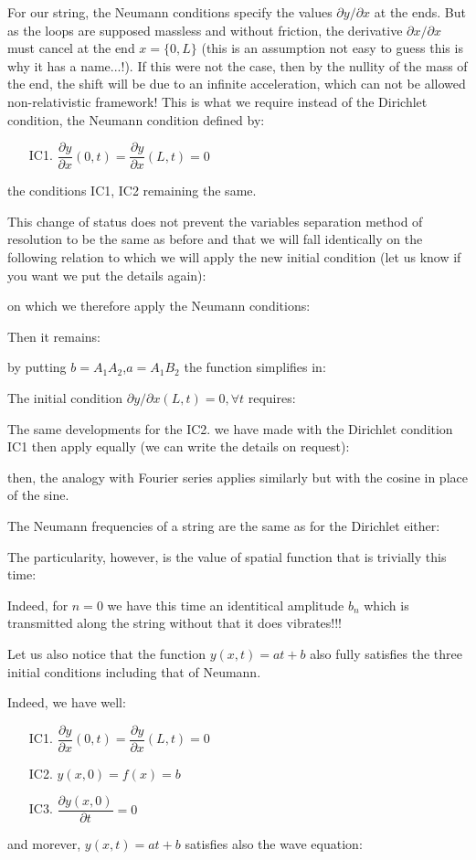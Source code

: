 	For our string, the Neumann conditions specify the values $\partial y/\partial x$ at the ends. But as the loops are supposed massless and without friction, the derivative $\partial x/\partial x$ must cancel at the end $x=\{0,L\}$ (this is an assumption not easy to guess this is why it has a name...!). If this were not the case, then by the nullity of the mass of the end, the shift will be due to an infinite acceleration, which can not be allowed non-relativistic framework! This is what we require instead of the Dirichlet condition, the Neumann condition defined by:
	
	\begin{enumerate}
		\item[IC1.] $\dfrac{\partial y}{\partial x}(0,t)=\dfrac{\partial y}{\partial x}(L,t)=0$
	\end{enumerate}
	the conditions IC1, IC2 remaining the same.
	
	This change of status does not prevent the variables separation method of resolution to be the same as before and that we will fall identically on the following relation to which we will apply the new initial condition (let us know if you want we put the details again):
	
	on which we therefore apply the Neumann conditions:
	
		Then it remains:
	
	by putting $b=A_1A_2$,$a=A_1B_2$ the function simplifies in:
	
	The initial condition $\partial y/\partial x(L,t)=0,\forall t$ requires:
	
	The same developments for the IC2. we have made with the Dirichlet condition IC1 then apply equally (we can write the details on request):
	
	then, the analogy with Fourier series applies similarly but with the cosine in place of the sine.

	The Neumann frequencies of a string are the same as for the Dirichlet either:
	
	The particularity, however, is the value of spatial function that is trivially this time:
	
	Indeed, for $n = 0$ we have this time an identitical  amplitude $b_n$ which is transmitted along the string without that it does vibrates!!!

	Let us also notice that the function $y(x,t)=at+b$ also fully satisfies the three initial conditions including that of Neumann.

	Indeed, we have well:
	\begin{enumerate}
		\item[IC1.] $\dfrac{\partial y}{\partial x}(0,t)=\dfrac{\partial y}{\partial x}(L,t)=0$

		\item[IC2.] $y(x,0)=f(x)=b$

		\item[IC3.] $\dfrac{\partial y(x,0)}{\partial t}=0$
	\end{enumerate}
	and morever, $y(x,t)=at+b$ satisfies also the wave equation:
	
